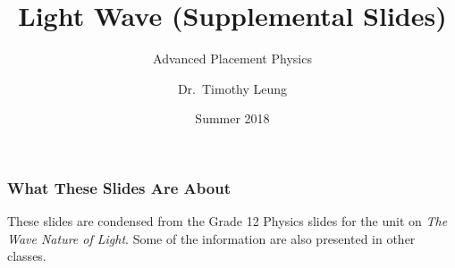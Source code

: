 \documentclass[compress,aspectratio=169]{beamer}
\title{Light Wave (Supplemental Slides)}
\subtitle{Advanced Placement Physics}
\author[TML]{Dr.\ Timothy Leung}
\institute{Olympiads School}
\date{Summer 2018}
\begin{document}
\begin{frame}
  \maketitle
\end{frame}

\begin{frame}
  \frametitle{What These Slides Are About}
  These slides are condensed from the Grade 12 Physics slides for the unit on
  \emph{The Wave Nature of Light}. Some of the information are also
  presented in other classes.
\end{frame}

\end{document}
